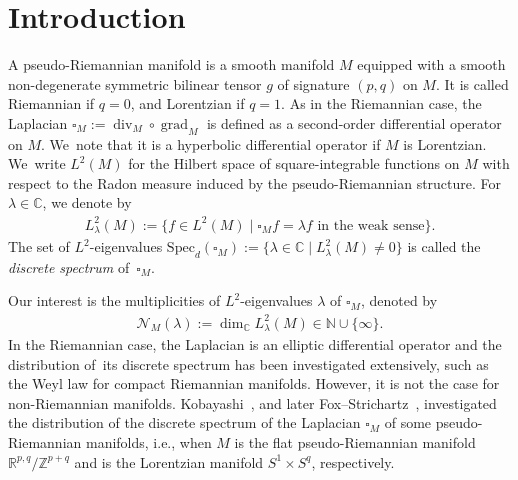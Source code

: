 \section{Introduction}
A pseudo-Riemannian manifold is a smooth manifold $M$ equipped with
a smooth non-degenerate symmetric bilinear tensor $g$
 of signature $(p,q)$ on $M$.
It is called Riemannian if $q=0$, and Lorentzian if $q=1$.
As in the Riemannian case,
the Laplacian $\square_{M}:=\operatorname{div}_{M} \circ \operatorname{grad}_{M}$
is defined as a second-order differential operator on $M$. We~note that it is a
hyperbolic differential operator if $M$ is Lorentzian. We~write $L^2(M)$ for the Hilbert space of square-integrable functions on $M$
with respect to the Radon measure induced by the pseudo-Riemannian structure.
For $\lambda \in \mathbb{C}$, we denote by
\begin{gather*}
L^2_{\lambda}(M) :=
\big\{f \in L^2(M) \mid \square_{M}f = \lambda f \text{ in the weak sense}\big\}.
\end{gather*}
The set of $L^2$-eigenvalues
$\mathrm{Spec}_{d}(\square_{M}) := \big\{ \lambda \in \mathbb{C}
\mid L^2_{\lambda}(M)\neq0\big\}$
is called the \textit{discrete spectrum} of~$\square_{M}$.

Our interest is the multiplicities of $L^2$-eigenvalues $\lambda$ of $\square_{M}$,
denoted by
\begin{gather*}
\mathcal{N}_{M}(\lambda):= \operatorname{dim}_{\mathbb{C}}L^2_{\lambda}(M)
\in \mathbb{N}\cup\{\infty\}.
\end{gather*}
In the Riemannian case, the Laplacian is an elliptic differential operator
and the distribution of~its discrete spectrum has been investigated extensively,
such as the Weyl law for compact Riemannian manifolds.
However, it is not the case for non-Riemannian manifolds.
Kobayashi~\cite{Kob16}, and later Fox--Strichartz~\cite{FoSt18},
investigated the distribution of the discrete spectrum of
the Laplacian $\square_{M}$ of some pseudo-Riemannian manifolds, i.e., when
$M$ is the flat pseudo-Riemannian manifold $\mathbb{R}^{p,q}/\mathbb{Z}^{p+q}$
and is the Lorentzian manifold $S^1\times S^{q}$, respectively.

